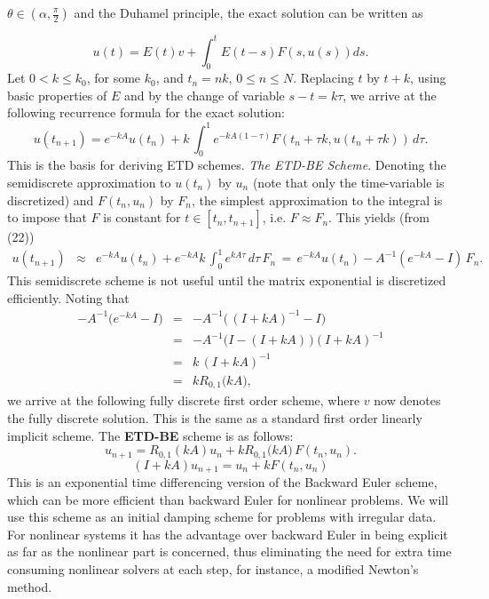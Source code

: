 \documentclass[12pt]{article}
\numberwithin{equation}{section} %
\begin{document}
$\theta \in (\alpha, \frac{\pi}{2})$ and the Duhamel principle, the
exact solution  can be written as

\begin{equation}
u(t)=E(t)v+\int_{0}^t E(t-s) F(s,u(s)) ds. \label{NL-DP}
\end{equation}
Let $0 < k \le k_0$, for some $k_0$, and $t_n = nk$, $0\leq n \leq N
$. Replacing $t$ by $t+k$, using basic properties of $E$ and by the
change of variable $s-t=k\tau$,  we arrive at the following
recurrence formula for the exact solution:
\begin{equation}
u(t_{n+1})= e^{-kA}u(t_n) + k\,\int_{0}^1 e^{-kA(1-\tau)} F(t_n+\tau
k, u(t_n+\tau k))\,d\tau.\label{Ch7-Eq2}
\end{equation}
This is the basis for deriving ETD schemes.
 {\em The ETD-BE Scheme}.
Denoting the semidiscrete  approximation to $u(t_n)$ by $u_n$ (note
that only the time-variable is discretized) and $F(t_n, u_n)$ by
$F_n$, the simplest approximation to the integral is to impose that
$F$ is constant for $t \in [t_n, t_{n+1}]$, i.e. $F \approx F_n$.
This yields (from (22))
\begin{eqnarray}
u(t_{n+1}) &\approx & e^{-kA}u(t_n) + e^{-kA} k  \,\int_{0}^1
e^{kA\tau} \,d\tau \,F_n \, = \, e^{-kA}u(t_n) - A^{-1}
\left(e^{-kA} - I\right) \,F_n.  \label{ETD1_sd}
\end{eqnarray}
This semidiscrete scheme  is not useful until the matrix exponential
is discretized efficiently.  Noting that
\begin{eqnarray}
 -A^{-1} \big( e^{-kA} -I \big) &=& -A^{-1}  \big(  \, (I+kA)^{-1} -I \big)\nonumber\\
             &=& -A^{-1}  \big( I-(I+kA) \,\big)(I+kA)^{-1}\nonumber\\
             &=& k \, (I+kA)^{-1}\nonumber\\
             &=& kR_{0,1}\big(kA\big),\label{derivation_ETD1}
\end{eqnarray}
we arrive at the following fully discrete first order scheme, where
$v$ now denotes the fully discrete solution. This is the same as a
standard first order linearly implicit  scheme. The \textbf{ETD-BE}
scheme is as follows:
\begin{equation}
u_{n+1} = R_{0,1}(kA)u_n + kR_{0,1}\big(kA\big) \,F(t_n, u_n).
\label{ETD1}
\end{equation}
\begin{equation}
(I+kA)u_{n+1}=u_n +kF(t_n,u_n)
\end{equation}
This is an exponential time differencing version of the Backward
Euler scheme, which can be more efficient than backward Euler for
nonlinear problems. We will use this scheme  as an initial damping
scheme for problems with irregular data.  For nonlinear systems it
has the advantage over backward Euler in being explicit as far as
the nonlinear part is concerned, thus eliminating the need for extra
time consuming nonlinear solvers at each step, for instance, a
modified Newton's method.
\end{document}
